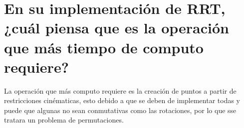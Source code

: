 \section{En su implementación de RRT, ¿cuál piensa que es la operación que más tiempo de computo requiere?}
La operación que más computo requiere es la creación de puntos a partir de restricciones cinématicas, esto debido a que se deben de implementar todas y puede que algunas no sean conmutativas como las rotaciones, por lo que sse tratara un problema de permutaciones.
